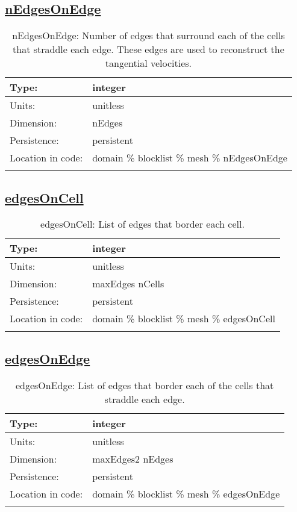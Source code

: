 \subsection[nEdgesOnEdge]{\hyperref[sec:var_tab_mesh]{nEdgesOnEdge}}
\label{subsec:var_sec_mesh_nEdgesOnEdge}
\begin{center}
\begin{longtable}{| p{2.0in} | p{4.0in} |}
        \hline 
        Type: & integer \\
        \hline 
        Units: & \si{unitless} \\
        \hline 
        Dimension: & nEdges \\
        \hline 
        Persistence: & persistent \\
        \hline 
         Location in code: & domain \% blocklist \% mesh \% nEdgesOnEdge \\
         \hline 
    \caption{nEdgesOnEdge: Number of edges that surround each of the cells that straddle each edge. These edges are used to reconstruct the tangential velocities.}
\end{longtable}
\end{center}
\subsection[edgesOnCell]{\hyperref[sec:var_tab_mesh]{edgesOnCell}}
\label{subsec:var_sec_mesh_edgesOnCell}
\begin{center}
\begin{longtable}{| p{2.0in} | p{4.0in} |}
        \hline 
        Type: & integer \\
        \hline 
        Units: & \si{unitless} \\
        \hline 
        Dimension: & maxEdges nCells \\
        \hline 
        Persistence: & persistent \\
        \hline 
         Location in code: & domain \% blocklist \% mesh \% edgesOnCell \\
         \hline 
    \caption{edgesOnCell: List of edges that border each cell.}
\end{longtable}
\end{center}
\subsection[edgesOnEdge]{\hyperref[sec:var_tab_mesh]{edgesOnEdge}}
\label{subsec:var_sec_mesh_edgesOnEdge}
\begin{center}
\begin{longtable}{| p{2.0in} | p{4.0in} |}
        \hline 
        Type: & integer \\
        \hline 
        Units: & \si{unitless} \\
        \hline 
        Dimension: & maxEdges2 nEdges \\
        \hline 
        Persistence: & persistent \\
        \hline 
         Location in code: & domain \% blocklist \% mesh \% edgesOnEdge \\
         \hline 
    \caption{edgesOnEdge: List of edges that border each of the cells that straddle each edge.}
\end{longtable}
\end{center}
